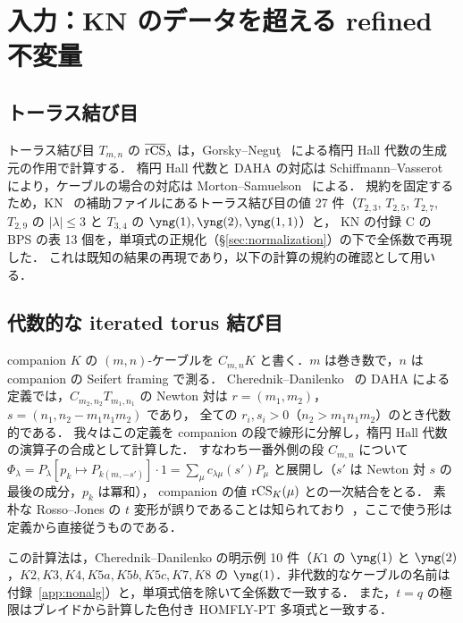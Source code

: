 \section{入力：KN のデータを超える refined 不変量}\label{sec:inputs}

\subsection{トーラス結び目}
トーラス結び目 $T_{m,n}$ の $\overline{\textrm{rCS}}_\lambda$ は，Gorsky--Neguţ~\cite{Gorsky13b} による楕円 Hall 代数の生成元の作用で計算する．
楕円 Hall 代数と DAHA の対応は Schiffmann--Vasserot~\cite{Schiffmann09} により，ケーブルの場合の対応は Morton--Samuelson~\cite{Morton14} による．
規約を固定するため，KN~\cite{Kameyama17} の補助ファイルにあるトーラス結び目の値 27 件（$T_{2,3}$, $T_{2,5}$, $T_{2,7}$, $T_{2,9}$ の $|\lambda|\le3$ と $T_{3,4}$ の $\yng(1),\yng(2),\yng(1,1)$）と，
KN の付録 C の BPS の表 13 個を，単項式の正規化（\S\ref{sec:normalization}）の下で全係数で再現した．
これは既知の結果の再現であり，以下の計算の規約の確認として用いる．

\subsection{代数的な iterated torus 結び目}
companion $K$ の $(m,n)$-ケーブルを $C_{m,n}K$ と書く．$m$ は巻き数で，$n$ は companion の Seifert framing で測る．
Cherednik--Danilenko~\cite{Cherednik14,Cherednik15} の DAHA による定義では，$C_{m_2,n_2}T_{m_1,n_1}$ の Newton 対は $r=(m_1,m_2)$，$s=(n_1,n_2-m_1n_1m_2)$ であり，
全ての $r_i,s_i>0$（$n_2>m_1n_1m_2$）のとき代数的である．
我々はこの定義を companion の段で線形に分解し，楕円 Hall 代数の演算子の合成として計算した．
すなわち一番外側の段 $C_{m,n}$ について $\Phi_\lambda=P_\lambda[p_k\mapsto P_{k(m,-s')}]\cdot1=\sum_\mu c_{\lambda\mu}(s')P_\mu$ と展開し（$s'$ は Newton 対 $s$ の最後の成分，$p_k$ は冪和），
companion の値 $\textrm{rCS}_K(\mu)$ との一次結合をとる．
素朴な Rosso--Jones の $t$ 変形が誤りであることは知られており~\cite{Danilenko14,Morozov18}，ここで使う形は定義から直接従うものである．
\begin{compresult}\label{cr:daha}
この計算法は，Cherednik--Danilenko の明示例 10 件（$K1$ の $\yng(1)$ と $\yng(2)$，$K2,K3,K4,K5a,K5b,K5c,K7,K8$ の $\yng(1)$．非代数的なケーブルの名前は付録~\ref{app:nonalg}）と，単項式倍を除いて全係数で一致する．
また，$t=q$ の極限はブレイドから計算した色付き HOMFLY-PT 多項式と一致する．
\end{compresult}

